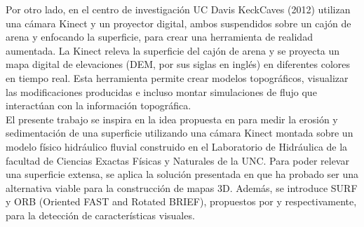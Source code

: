 Por otro lado, en el centro de investigación UC Davis KeckCaves (2012)\cite{arsandbox} utilizan una cámara Kinect y un proyector digital, ambos suspendidos sobre un cajón de arena y enfocando la superficie, para crear una herramienta de realidad aumentada. La Kinect releva la superficie del cajón de arena y se proyecta un mapa digital de elevaciones (DEM, por sus siglas en inglés) en diferentes colores en tiempo real. Esta herramienta permite crear modelos topográficos, visualizar las modificaciones producidas e incluso montar simulaciones de flujo que interactúan con la información topográfica. \\

El presente trabajo se inspira en la idea propuesta en \cite{arsandbox} para medir la erosión y sedimentación de una superficie utilizando una cámara Kinect montada sobre un modelo físico hidráulico fluvial construido en el Laboratorio de Hidráulica de la facultad de Ciencias Exactas Físicas y Naturales de la UNC. Para poder relevar una superficie extensa, se aplica la solución presentada en \cite{henry2010rgb} que ha probado ser una alternativa viable para la construcción de mapas 3D. Además, se introduce SURF y ORB (Oriented FAST and Rotated BRIEF)\cite{RubleeRKB11}, propuestos por \cite{engelhard2011real} y \cite{fioraio2011realtime} respectivamente, para la detección de características visuales.
